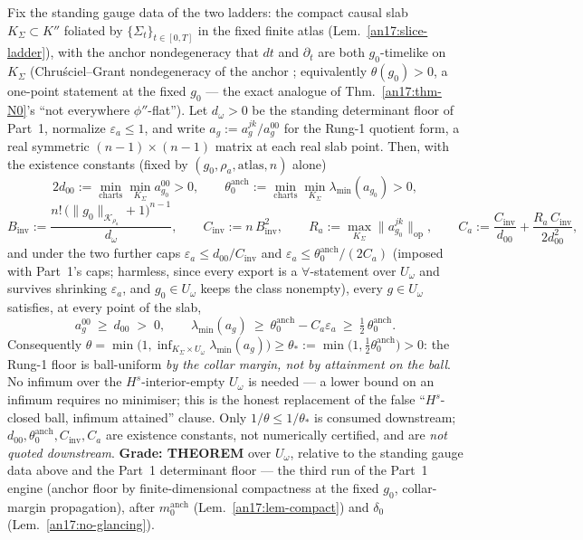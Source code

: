 \begin{lemma}
\label{an17:attainment}
Fix the standing gauge data of the two ladders: the compact causal slab
$K_\Sigma\subset K''$ foliated by $\{\Sigma_t\}_{t\in[0,T]}$ in the fixed
finite atlas (Lem.~\ref{an17:slice-ladder}), with the anchor nondegeneracy
that $dt$ and $\partial_t$ are both $g_0$-timelike on $K_\Sigma$
(Chru\'sciel--Grant nondegeneracy of the anchor \cite{ChruscielGrant2012};
equivalently $\theta(g_0)>0$, a one-point statement at the fixed $g_0$ ---
the exact analogue of Thm.~\ref{an17:thm-N0}'s ``not everywhere
$\phi''$-flat''). Let $d_\omega>0$ be the standing determinant floor of
Part~1, normalize $\varepsilon_a\le1$, and write $a_g:=a^{jk}_g/a^{00}_g$
for the Rung-1 quotient form, a real symmetric $(n{-}1)\times(n{-}1)$
matrix at each real slab point. Then, with the existence constants (fixed
by $(g_0,\rho_a,\text{atlas},n)$ alone)
\[
 2d_{00}:=\min_{\mathrm{charts}}\min_{K_\Sigma}a^{00}_{g_0}>0,\qquad
 \theta_0^{\mathrm{anch}}:=\min_{\mathrm{charts}}\min_{K_\Sigma}
 \lambda_{\min}(a_{g_0})>0,
\]
\[
 B_{\mathrm{inv}}:=\frac{n!\,\bigl(\|g_0\|_{\mathcal K_{\rho_a}}+1\bigr)^{n-1}}
 {d_\omega},\qquad C_{\mathrm{inv}}:=n\,B_{\mathrm{inv}}^2,\qquad
 R_a:=\max_{K_\Sigma}\|a^{jk}_{g_0}\|_{\mathrm{op}},\qquad
 C_a:=\frac{C_{\mathrm{inv}}}{d_{00}}+\frac{R_a\,C_{\mathrm{inv}}}{2d_{00}^2},
\]
and under the two further caps $\varepsilon_a\le d_{00}/C_{\mathrm{inv}}$
and $\varepsilon_a\le\theta_0^{\mathrm{anch}}/(2C_a)$ (imposed with
Part~1's caps; harmless, since every export is a $\forall$-statement over
$U_\omega$ and survives shrinking $\varepsilon_a$, and $g_0\in U_\omega$
keeps the class nonempty), every $g\in U_\omega$ satisfies, at every point
of the slab,
\[
 a^{00}_g\ \ge\ d_{00}\;>\;0,\qquad
 \lambda_{\min}(a_g)\ \ge\ \theta_0^{\mathrm{anch}}-C_a\varepsilon_a\ \ge\
 \tfrac12\,\theta_0^{\mathrm{anch}} .
\]
Consequently $\theta=\min\bigl(1,\inf_{K_\Sigma\times U_\omega}
\lambda_{\min}(a_g)\bigr)\ge\theta_*:=\min\bigl(1,\tfrac12
\theta_0^{\mathrm{anch}}\bigr)>0$: the Rung-1 floor is ball-uniform
\emph{by the collar margin, not by attainment on the ball}. No infimum
over the $H^s$-interior-empty $U_\omega$ is needed --- a lower bound on an
infimum requires no minimiser; this is the honest replacement of the false
``$H^s$-closed ball, infimum attained'' clause. Only $1/\theta\le1/\theta_*$ is consumed
downstream; $d_{00},\theta_0^{\mathrm{anch}},C_{\mathrm{inv}},C_a$ are
existence constants, not numerically certified, and are \emph{not quoted
downstream}. \textbf{Grade: THEOREM} over $U_\omega$, relative to the
standing gauge data above and the Part~1 determinant floor --- the third
run of the Part~1 engine (anchor floor by finite-dimensional compactness
at the fixed $g_0$, collar-margin propagation), after $m_0^{\mathrm{anch}}$
(Lem.~\ref{an17:lem-compact}) and $\delta_0$ (Lem.~\ref{an17:no-glancing}).
\end{lemma}
